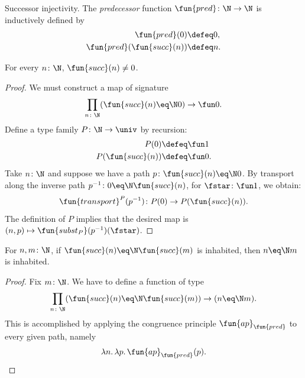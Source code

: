 \begin{lpar}{Successor injectivity.}
    The \textsl{predecessor} function $\fun{pred}\colon\N\to\N$ is inductively defined by
            \begin{align*}
                \fun{pred}(0)&\defeq0,\\
                \fun{pred}(\fun{succ}(n))&\defeq n.
            \end{align*}

    \begin{lem}\label{lem:succ-ne-0}
        For every\/ $n\colon\N$, $\fun{succ}(n)\neq0$.
    \end{lem}
    
    \begin{proof}
        We must construct a map of signature
        \[
            \prod_{n\colon\N}(\fun{succ}(n)\eq\N0)\to\fun0.
        \]
        Define a type family $P\colon\N\to\univ$ by recursion:
        \begin{align*}
            P(0)&\defeq\fun1\\
            P(\fun{succ}(n))&\defeq\fun0.
        \end{align*}
        Take $n\colon\N$ and suppose we have a path $p\colon\fun{succ}(n)\eq\N0$. By transport along the inverse path $p^{-1}\colon0\eq\N\fun{succ}(n)$, for $\fstar\colon\fun1$, we obtain:
        \[
            \fun{transport}^P(p^{-1})\colon P(0)\to P(\fun{succ}(n)).
        \]
        The definition of $P$ implies that the desired map is $(n,p)\mapsto\fun{subst_P}(p^{-1})(\fstar)$.
    \end{proof}

    \begin{lem}
        For\/ $n,m\colon\N$, if\/ $\fun{succ}(n)\eq\N\fun{succ}(m)$ is inhabited, then\/ $n\eq\N m$ is inhabited.
    \end{lem}
    
    \begin{proof}
        Fix $m\colon\N$. We have to define a function of type
        \[
            \prod_{n\colon\N}(\fun{succ}(n)\eq\N\fun{succ}(m)) \to (n\eq\N m).
        \]
        This is accomplished by applying the congruence principle $\fun{ap}_{\fun{pred}}$ to every given path, namely
        \[
            \lambda n.\,\lambda p.\,\fun{ap}_{\fun{pred}}(p).
        \]
    \end{proof}
    
\end{lpar}

